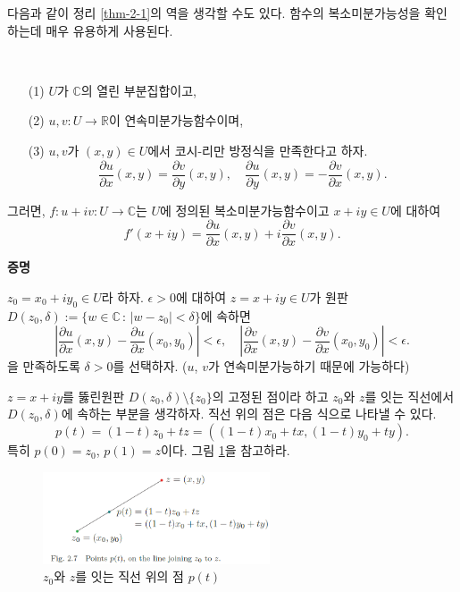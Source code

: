 다음과 같이 정리 \ref{thm-2-1}의 역을 생각할 수도 있다.
함수의 복소미분가능성을 확인하는데 매우 유용하게 사용된다.

\begin{salt_theorem}\label{thm-2-2}
\
\begin{itemize}
\item[(1)] $U$가 $\mathbb C$의 열린 부분집합이고,
\item[(2)] $u,v: U\to \mathbb R$이 연속미분가능함수이며,
\item[(3)] $u,v$가 $(x,y)\in U$에서 코시-리만 방정식을 만족한다고 하자.
$$
\dfrac{\partial u}{\partial x}(x, y) = \dfrac{\partial v}{\partial y}(x, y),
\quad
\dfrac{\partial u}{\partial y}(x, y) = - \dfrac{\partial v}{\partial x}(x, y).
$$
\end{itemize}
그러면, $f:u+iv: U\to \mathbb C$는 $U$에 정의된 복소미분가능함수이고
$x+iy\in U$에 대하여
$$
f'(x+iy) = \dfrac{\partial u}{\partial x}(x, y) + i \dfrac{\partial v}{\partial x}(x, y).
$$
\end{salt_theorem}

{\bf 증명}

$z_0 = x_0 + iy_0 \in U$라 하자.
$\epsilon>0$에 대하여 
$z=x+iy\in U$가 원판 $D(z_0,\delta) := \{ w \in\mathbb C \,:\, |w-z_0| < \delta \}$에
속하면
\begin{equation}\label{eq-2-7}
\left| \dfrac{\partial u}{\partial x}(x,y) - \dfrac{\partial u}{\partial x}(x_0,y_0) \right| < \epsilon,
\quad
\left| \dfrac{\partial v}{\partial x}(x,y) - \dfrac{\partial v}{\partial x}(x_0,y_0) \right| < \epsilon.
\end{equation}
을 만족하도록 $\delta>0$를 선택하자.
($u$, $v$가 연속미분가능하기 때문에 가능하다)

$z=x+iy$를 뚫린원판 $D(z_0,\delta)\setminus\{ z_0\}$의 고정된 점이라 하고
$z_0$와 $z$를 잇는 직선에서 $D(z_0,\delta)$에 속하는 부분을 생각하자.
직선 위의 점은 다음 식으로 나타낼 수 있다.
\[
p(t) = (1-t)z_0 + tz = \left( (1-t)x_0+tx, (1-t)y_0+ty \right).
\]
특히 $p(0)=z_0$, $p(1)=z$이다. 그림 \ref{fig-2-7}을 참고하라.

\begin{figure}[!h]
\begin{center}
\includegraphics[width=0.6\textwidth]{./SaltChapter/fig-2-7}
\end{center}
\caption{$z_0$와 $z$를 잇는 직선 위의 점 $p(t)$}
\label{fig-2-7}
\end{figure}

